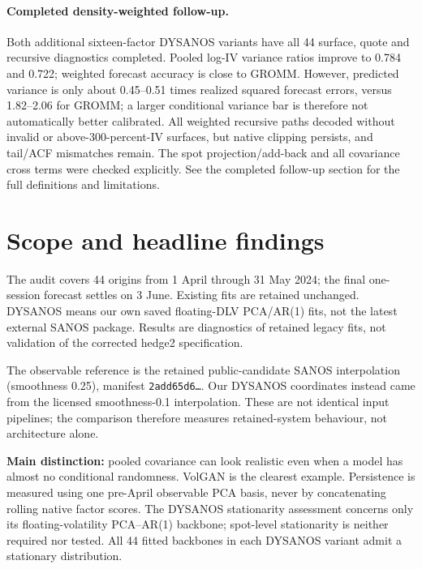 \documentclass[11pt]{article}
\begin{document}
\paragraph{Completed density-weighted follow-up.} Both additional sixteen-factor DYSANOS variants have all 44 surface, quote and recursive diagnostics completed. Pooled log-IV variance ratios improve to 0.784 and 0.722; weighted forecast accuracy is close to GROMM. However, predicted variance is only about 0.45--0.51 times realized squared forecast errors, versus 1.82--2.06 for GROMM; a larger conditional variance bar is therefore not automatically better calibrated. All weighted recursive paths decoded without invalid or above-300-percent-IV surfaces, but native clipping persists, and tail/ACF mismatches remain. The spot projection/add-back and all covariance cross terms were checked explicitly. See the completed follow-up section for the full definitions and limitations.

\section{Scope and headline findings}

The audit covers 44 origins from 1 April through 31 May 2024; the final one-session forecast settles on 3 June. Existing fits are retained unchanged. DYSANOS means our own saved floating-DLV PCA/AR(1) fits, not the latest external SANOS package. Results are diagnostics of retained legacy fits, not validation of the corrected hedge2 specification.

The observable reference is the retained public-candidate SANOS interpolation (smoothness 0.25), manifest \texttt{2add65d6\ldots}. Our DYSANOS coordinates instead came from the licensed smoothness-0.1 interpolation. These are not identical input pipelines; the comparison therefore measures retained-system behaviour, not architecture alone.

\textbf{Main distinction:} pooled covariance can look realistic even when a model has almost no conditional randomness. VolGAN is the clearest example. Persistence is measured using one pre-April observable PCA basis, never by concatenating rolling native factor scores. The DYSANOS stationarity assessment concerns only its floating-volatility PCA--AR(1) backbone; spot-level stationarity is neither required nor tested. All 44 fitted backbones in each DYSANOS variant admit a stationary distribution.
\end{document}
